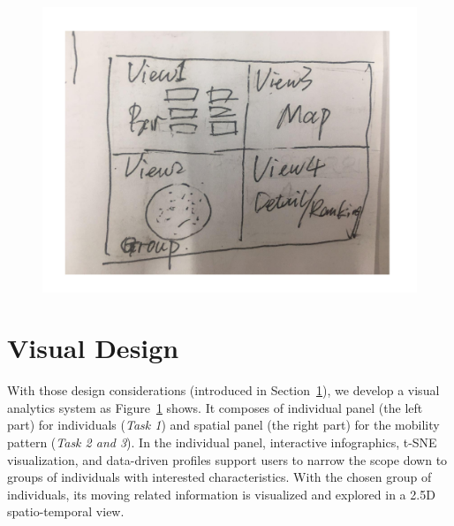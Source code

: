 \begin{figure}[htb!]
 \centering %
 \includegraphics[width=\linewidth]{pictures/interfaceDraft.pdf}
 \caption{}
 \label{fig:interfaceDraft}
\end{figure}



\section{Visual Design}

With those design considerations (introduced in Section~\ref{}), we develop a visual analytics system as Figure~\ref{fig:interfaceDraft} shows. It composes of individual panel (the left part) for individuals (\textit{Task 1}) and spatial panel (the right part) for the mobility pattern (\textit{Task 2 and 3}). In the individual panel, interactive infographics, t-SNE visualization, and data-driven profiles support users to narrow the scope down to groups of individuals with interested characteristics. With the chosen group of individuals, its moving related information is visualized and explored in a 2.5D spatio-temporal view. 


